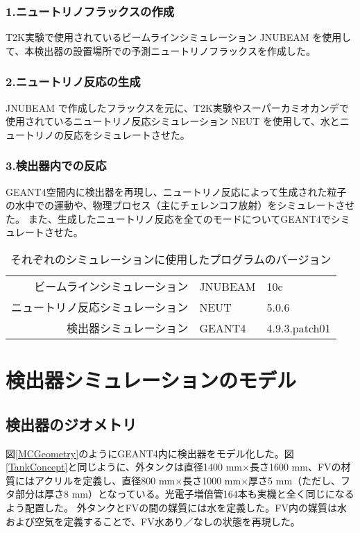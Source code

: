 \documentclass[11pt]{jreport}
\newcommand{\figref}[1]{図\ref{#1}}
\begin{document}
\subsubsection{1.ニュートリノフラックスの作成}
T2K実験で使用されているビームラインシミュレーション JNUBEAM を使用して、本検出器の設置場所での予測ニュートリノフラックスを作成した。

\subsubsection{2.ニュートリノ反応の生成}
JNUBEAM で作成したフラックスを元に、T2K実験やスーパーカミオカンデで使用されているニュートリノ反応シミュレーション NEUT を使用して、水とニュートリノの反応をシミュレートさせた。

\subsubsection{3.検出器内での反応}
GEANT4空間内に検出器を再現し、ニュートリノ反応によって生成された粒子の水中での運動や、物理プロセス（主にチェレンコフ放射）をシミュレートさせた。
また、生成したニュートリノ反応を全てのモードについてGEANT4でシミュレートさせた。

\begin{table}[!htbp]
\caption[シミュレーションプログラムのバージョン]{それぞれのシミュレーションに使用したプログラムのバージョン}
\begin{center}
\begin{tabular}{rll}
\hline \hline
ビームラインシミュレーション & JNUBEAM &10c\\
ニュートリノ反応シミュレーション & NEUT & 5.0.6\\
検出器シミュレーション & GEANT4 & 4.9.3.patch01\\
\hline \hline
\end{tabular}
\end{center}
\label{MCProgramTable}
\end{table}%
\fi

\section{検出器シミュレーションのモデル}
\subsection{検出器のジオメトリ}
\figref{MCGeometry}のようにGEANT4内に検出器をモデル化した。\figref{TankConcept}と同じように、外タンクは直径1400 mm$\times$長さ1600 mm、FVの材質にはアクリルを定義し、直径800 mm$\times$長さ1000 mm$\times$厚さ5 mm（ただし、フタ部分は厚さ8 mm）となっている。光電子増倍管164本も実機と全く同じになるよう配置した。
外タンクとFVの間の媒質には水を定義した。FV内の媒質は水および空気を定義することで、FV水あり／なしの状態を再現した。
\end{document}
